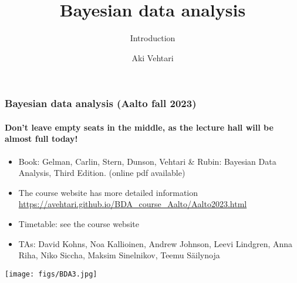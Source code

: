 \documentclass[english,t]{beamer}
\date{}
\title[]{Bayesian data analysis}
\subtitle{Introduction}
\author{Aki Vehtari}
\institute[Aalto University]{}
\begin{document}
\begin{frame}
  \frametitle{Bayesian data analysis (Aalto fall 2023)}  %
  \framesubtitle{Don't leave empty seats in the middle, as the lecture hall will be almost full today!}
  \begin{itemize}
  \item Book: Gelman, Carlin, Stern, Dunson, Vehtari \& Rubin: Bayesian Data
    Analysis, Third Edition. {\footnotesize (online pdf available)}
  \item The course website has more detailed information\\
    {\small\url{https://avehtari.github.io/BDA_course_Aalto/Aalto2023.html}}
  \item Timetable: see the course website
  \item TAs: David Kohns, Noa Kallioinen, Andrew Johnson, Leevi
    Lindgren, Anna Riha, Niko Siccha, Maksim Sinelnikov, Teemu
    Säilynoja
    \end{itemize}
    \vspace{-0.25\baselineskip}
 \begin{center}
   \texttt{[image: figs/BDA3.jpg]}
 \end{center}

\end{frame}
\end{document}

